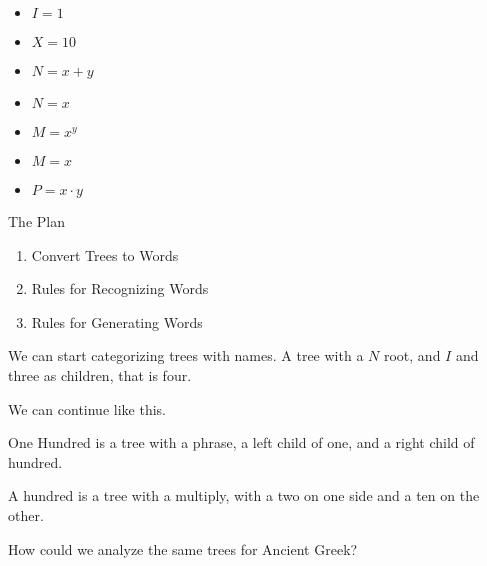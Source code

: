 \documentclass{report}
\begin{document}
\begin{description}
\begin{mdframed}
            \begin{itemize}
                \item $I = 1$
                \item $X = 10$
                \item $N = x + y$
                \item $N = x$
                \item $M = x ^ y$
                \item $M = x$
                \item $P = x \cdot y$
            \end{itemize}
        \end{mdframed}
    \item The Plan
        \begin{enumerate}
            \item Convert Trees to Words
            \item Rules for Recognizing Words
            \item Rules for Generating Words
        \end{enumerate}
        \begin{mdframed}
            We can start categorizing trees with names. 
            A tree with a $N$ root, and  $I$ and three
            as children, that is four.

            We can continue like this.

            One Hundred is a tree with a phrase, a
            left child of one, and a right child
            of hundred.

            A hundred is a tree with a multiply,
            with a two on one side and a ten on
            the other.
        \end{mdframed}
        \begin{mdframed}
            How could we analyze the same trees for Ancient Greek?


\end{mdframed}
\end{description}
\end{document}
